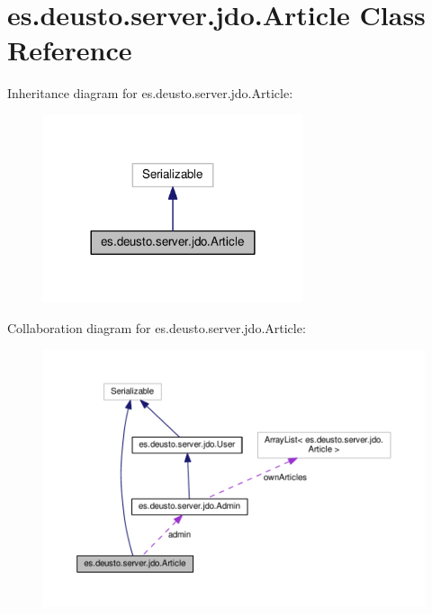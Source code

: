 \hypertarget{classes_1_1deusto_1_1server_1_1jdo_1_1_article}{}\section{es.\+deusto.\+server.\+jdo.\+Article Class Reference}
\label{classes_1_1deusto_1_1server_1_1jdo_1_1_article}


Inheritance diagram for es.\+deusto.\+server.\+jdo.\+Article\+:
\nopagebreak
\begin{figure}[H]
\begin{center}
\leavevmode
\includegraphics[width=216pt]{classes_1_1deusto_1_1server_1_1jdo_1_1_article__inherit__graph}
\end{center}
\end{figure}


Collaboration diagram for es.\+deusto.\+server.\+jdo.\+Article\+:
\nopagebreak
\begin{figure}[H]
\begin{center}
\leavevmode
\includegraphics[width=350pt]{classes_1_1deusto_1_1server_1_1jdo_1_1_article__coll__graph}
\end{center}
\end{figure}
